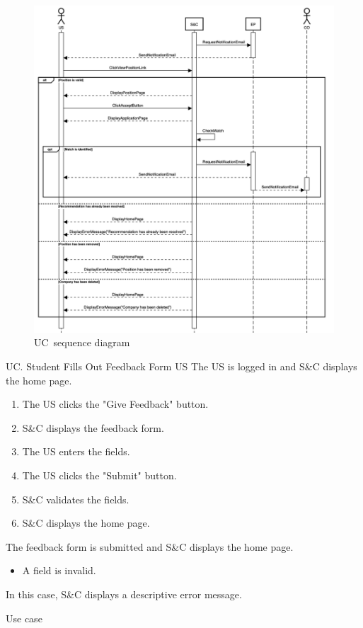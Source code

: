 \begin{figure}
    \centering
    \includegraphics[width=16cm]{images/sequence-diagrams/student-accepts-recommendation.png}
    \caption{UC\theuc\ sequence diagram}
\end{figure}


\clearpage
\begin{usecase}
    {UC\theuc. Student Fills Out Feedback Form}
    {US}
    {The US is logged in and S\&C displays the home page.}
    {\begin{enumerate}[leftmargin=*]
        \item The US clicks the "Give Feedback" button.
        \item S\&C displays the feedback form.
        \item The US enters the fields.
        \item The US clicks the "Submit" button.
        \item S\&C validates the fields.
        \item S\&C displays the home page.
    \end{enumerate}}
    {The feedback form is submitted and S\&C displays the home page.}
    {\begin{itemize}[leftmargin=*, label=\tiny\textbullet]
        \item A field is invalid.
    \end{itemize}
    In this case, S\&C displays a descriptive error message.}
    {Use case \theuc}
\end{usecase}

